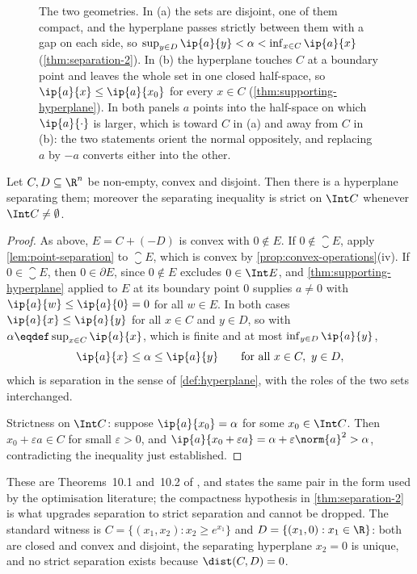 \begin{figure}[htbp]
	\centering
	
	\caption[Separation and support]{The two geometries. In (a) the sets are
		disjoint, one of them compact, and the hyperplane passes strictly between
		them with a gap on each side, so
		$\sup_{y\in D}\ip{a}{y}<\alpha<\inf_{x\in C}\ip{a}{x}$
		(\autoref{thm:separation-2}). In (b) the hyperplane touches $C$ at a
		boundary point and leaves the whole set in one closed half-space, so
		$\ip{a}{x}\leq\ip{a}{x_0}$ for every $x\in C$
		(\autoref{thm:supporting-hyperplane}). In both panels $a$ points into the
		half-space on which $\ip{a}{\cdot}$ is larger, which is toward $C$ in (a)
		and away from $C$ in (b): the two statements orient the normal
		oppositely, and replacing $a$ by $-a$ converts either into the other.}
	\label{fig:separation}
\end{figure}

\begin{theorem}[Separation]\label{thm:separation-1}
	Let $C,D\subseteq\R^n$ be non-empty, convex and disjoint. Then there is a
	hyperplane separating them; moreover the separating inequality is strict on
	$\Int C$ whenever $\Int C\neq\emptyset$.
\end{theorem}

\begin{proof}
	As above, $E=C+(-D)$ is convex with $0\notin E$. If $0\notin\closure E$, apply
	\autoref{lem:point-separation} to $\closure E$, which is convex by
	\autoref{prop:convex-operations}(iv). If $0\in\closure E$, then $0\in\partial E$,
	since $0\notin E$ excludes $0\in\Int E$, and
	\autoref{thm:supporting-hyperplane} applied to $E$ at its boundary point $0$
	supplies $a\neq0$ with $\ip{a}{w}\leq\ip{a}{0}=0$ for all $w\in E$. In both
	cases $\ip{a}{x}\leq\ip{a}{y}$ for all $x\in C$ and $y\in D$, so with
	$\alpha\eqdef\sup_{x\in C}\ip{a}{x}$, which is finite and at most
	$\inf_{y\in D}\ip{a}{y}$,
	\[
		\ip{a}{x}\leq\alpha\leq\ip{a}{y}\qquad\text{for all }x\in C,\ y\in D,
	\]
	which is separation in the sense of \autoref{def:hyperplane}, with the roles of
	the two sets interchanged.

	Strictness on $\Int C$: suppose $\ip{a}{x_0}=\alpha$ for some
	$x_0\in\Int C$. Then $x_0+\varepsilon a\in C$ for small $\varepsilon>0$, and
	$\ip{a}{x_0+\varepsilon a}=\alpha+\varepsilon\norm{a}^2>\alpha$, contradicting
	the inequality just established.
\end{proof}

These are Theorems~10.1 and~10.2 of \textcite[pp.~337, 339]{fukuda2026notes},
and \textcite[Sec.~2.5, p.~46]{boyd2004convex} states the same pair in the form
used by the optimisation literature;
the compactness hypothesis in \autoref{thm:separation-2} is what upgrades
separation to strict separation and cannot be dropped. The standard witness is
$C=\{(x_1,x_2) : x_2\geq e^{x_1}\}$ and $D=\{(x_1,0) : x_1\in\R\}$: both are
closed and convex and disjoint, the separating hyperplane $x_2=0$ is unique, and
no strict separation exists because $\dist(C,D)=0$.


